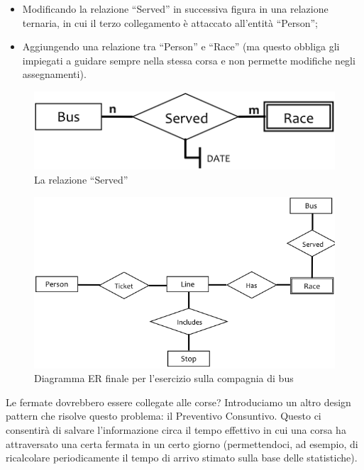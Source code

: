 \begin{itemize}

\item Modificando la relazione “Served” in successiva figura in una relazione ternaria, in cui il terzo collegamento è attaccato all’entità “Person”;
\item Aggiungendo una relazione tra “Person” e “Race” (ma questo obbliga gli impiegati a guidare sempre nella stessa corsa e non permette modifiche negli assegnamenti).

\end{itemize}

\begin{center}
\begin{figure}[H]
\centering
\includegraphics[scale=1]{figures/served.png}
\caption{La relazione “Served”} 
\end{figure}
\end{center}

\newpage
\begin{center}
\begin{figure}[H]
\centering
\includegraphics[scale=0.8]{figures/finalbusER.png}
\caption{Diagramma ER finale per l’esercizio sulla compagnia di bus} 
\end{figure}
\end{center}
\newpage

Le fermate dovrebbero essere collegate alle corse? Introduciamo un altro design pattern che risolve questo problema: il Preventivo Consuntivo. Questo ci consentirà di salvare l’informazione circa il tempo effettivo in cui una corsa ha attraversato una certa fermata in un certo giorno (permettendoci, ad esempio, di ricalcolare periodicamente il tempo di arrivo stimato sulla base delle statistiche).

